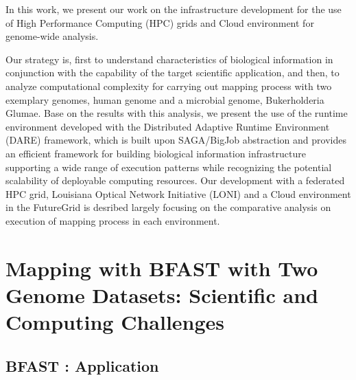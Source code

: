 \documentclass{acm_proc_article-sp}
\begin{document}
 In
this work, we present our work on the infrastructure development for
the use of High Performance Computing (HPC) grids and Cloud
environment for genome-wide analysis.

Our strategy is, first to understand characteristics of biological information in conjunction with the capability of the target scientific application, and then, to analyze computational complexity for carrying out mapping process with two exemplary genomes, human genome and a microbial genome, Bukerholderia Glumae.  Base on the results with this analysis, we present the use of the runtime environment developed with the Distributed Adaptive Runtime Environment (DARE) framework, which is built upon SAGA/BigJob abstraction and provides an efficient framework for building biological information infrastructure supporting a wide range of execution patterns while recognizing the potential scalability of deployable computing resources.  Our development with a federated HPC grid, Louisiana Optical Network Initiative (LONI) and a Cloud environment in the FutureGrid is desribed largely focusing on the comparative analysis on execution of mapping process in each environment. 




\section{Mapping with BFAST with Two \\ Genome Datasets: Scientific and Computing Challenges}

\subsection{BFAST : Application}
\end{document}
